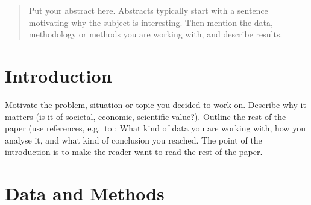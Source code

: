 \documentclass{article}
\theoremstyle{plain}
\theoremstyle{definition}
\theoremstyle{remark}
\begin{document}
\printAffiliationsAndNotice{\icmlEqualContribution} %

\begin{abstract}
Put your abstract here. Abstracts typically start with a sentence motivating why the subject is interesting. Then mention the data, methodology or methods you are working with, and describe results. 
\end{abstract}

\section{Introduction}\label{sec:intro}

Motivate the problem, situation or topic you decided to work on. Describe why it matters (is it of societal, economic, scientific value?). Outline the rest of the paper (use references, e.g.~to : What kind of data you are working with, how you analyse it, and what kind of conclusion you reached. The point of the introduction is to make the reader want to read the rest of the paper.

\section{Data and Methods}\label{sec:methods}
\end{document}
